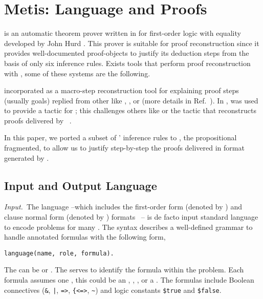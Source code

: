 \documentclass[../main.tex]{subfiles}
\begin{document}

\section{Metis: Language and Proofs}
\label{sec:metis-language-and-proofs}

\Metis is an automatic theorem prover written in 
for first-order logic with equality developed by John Hurd
\cite{hurd2003first}. This prover is suitable for proof
reconstruction since it provides well-documented proof-objects to
justify its deduction steps from the basis of only six inference
rules. Exists tools that perform proof reconstruction with \Metis,
some of these systems are the following.

 incorporated \Metis as a macro-step
reconstruction tool for explaining proof steps (usually \CNF goals)
replied from other \ATPs like , , or
 (more details in Ref.~\cite{paulson2007source}).
In \cite{Farber2015}, \Metis was used to provide a tactic for
; this challenges others like 
or the  tactic that reconstructs proofs
delivered by ~\cite{Farber2016}.

In this paper, we ported a subset of \Metis' inference rules to
\Agda, the propositional fragmented, to allow us to justify
step-by-step the proofs delivered in \TSTP format generated
by \Metis.


\subsection{Input and Output Language}
\label{ssec:input-and-output-language}

\textit{Input.}~The \TPTP language --which includes the first-order
form (denoted by ) and clause normal form (denoted by
) formats~\cite{sutcliffe2009} -- is de facto input
standard language to encode problems for many \ATPs. The \TPTP
syntax describes a well-defined grammar to handle annotated formulas
with the following form,

\begin{verbatim}
language(name, role, formula).
\end{verbatim}

The  can be  or . The 
serves to identify the formula within the problem. Each formula
assumes one , this could be an ,
, , or a .
The formulas include Boolean connectives (\verb!&!, \verb!|!,
\verb!=>!, \verb!{<=>!, \verb!~!) and logic constants \verb!$true!
and \verb!$false!.
\end{document}

